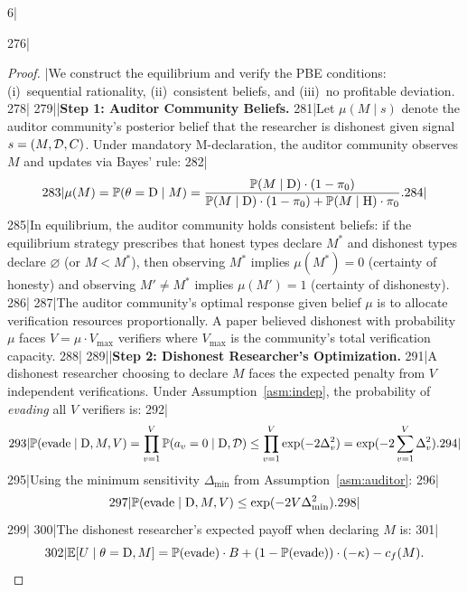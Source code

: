 6|\documentclass[12pt,a4paper]{article}
\begin{document}
276|\begin{proof}|We construct the equilibrium and verify the PBE conditions: (i)~sequential rationality, (ii)~consistent beliefs, and (iii)~no profitable deviation.
278|
279||\noindent\textbf{Step 1: Auditor Community Beliefs.}
281|Let $\mu(M \mid s)$ denote the auditor community's posterior belief that the researcher is dishonest given signal $s = (M, \mathcal{D}, C)$. Under mandatory M-declaration, the auditor community observes $M$ and updates via Bayes' rule:
282|\begin{equation}\label{eq:belief}
283|    \mu(M) = \mathbb{P}(\theta = \text{D} \mid M) = \frac{\mathbb{P}(M \mid \text{D}) \cdot (1-\pi_0)}{\mathbb{P}(M \mid \text{D}) \cdot (1-\pi_0) + \mathbb{P}(M \mid \text{H}) \cdot \pi_0}.
284|\end{equation}
285|In equilibrium, the auditor community holds consistent beliefs: if the equilibrium strategy prescribes that honest types declare $M^*$ and dishonest types declare $\varnothing$ (or $M < M^*$), then observing $M^*$ implies $\mu(M^*) = 0$ (certainty of honesty) and observing $M' \neq M^*$ implies $\mu(M') = 1$ (certainty of dishonesty).
286|
287|The auditor community's optimal response given belief $\mu$ is to allocate verification resources proportionally. A paper believed dishonest with probability $\mu$ faces $V = \mu \cdot V_{\max}$ verifiers where $V_{\max}$ is the community's total verification capacity.
288|
289||\noindent\textbf{Step 2: Dishonest Researcher's Optimization.}
291|A dishonest researcher choosing to declare $M$ faces the expected penalty from $V$ independent verifications. Under Assumption~\ref{asm:indep}, the probability of \emph{evading} all $V$ verifiers is:
292|\begin{equation}\label{eq:evasion}
293|    \mathbb{P}(\text{evade} \mid \text{D}, M, V) = \prod_{v=1}^{V} \mathbb{P}(a_v = 0 \mid \text{D}, \mathcal{D}) \le \prod_{v=1}^{V} \exp(-2\Delta_v^2) = \exp(-2\sum_{v=1}^{V}\Delta_v^2).
294|\end{equation}
295|Using the minimum sensitivity $\Delta_{\min}$ from Assumption~\ref{asm:auditor}:
296|\begin{equation}\label{eq:evasion_bound}
297|    \mathbb{P}(\text{evade} \mid \text{D}, M, V) \le \exp(-2V\Delta_{\min}^2).
298|\end{equation}
299|
300|The dishonest researcher's expected payoff when declaring $M$ is:
301|\begin{equation}\label{eq:U_dis}
302|    \E[U \mid \theta = \text{D}, M] = \Pbb(\text{evade}) \cdot B + (1 - \Pbb(\text{evade})) \cdot (-\kappa) - c_f(M).

\end{equation}
\end{proof}
\end{document}
